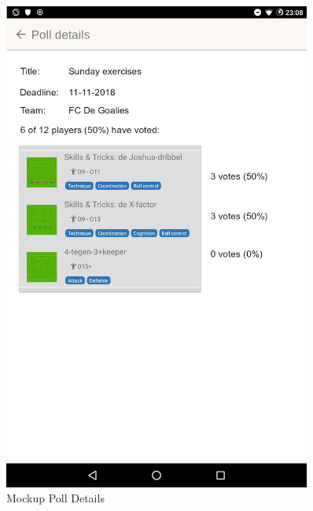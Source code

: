 \begin{appendices}
\begin{figure}[H]
    \centering
    \includegraphics[width=0.9\textwidth,keepaspectratio]{content/pictures/mockups/poll.png}
    \caption{Mockup Poll Details}
	\label{fig:mockup_poll_details}
\end{figure}


\end{appendices}
